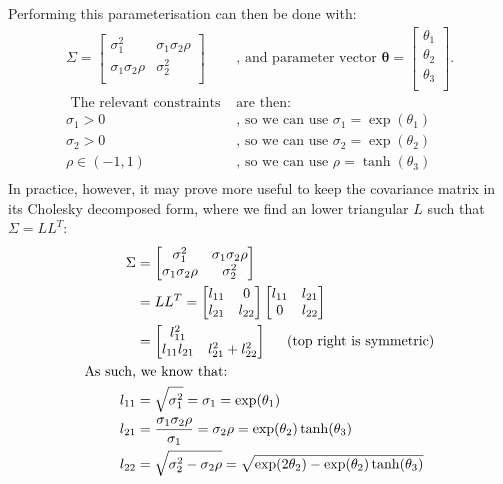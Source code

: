 \documentclass[11pt]{article} %
\begin{document}
Performing this parameterisation can then be done with:
\begin{align*}
\Sigma = \begin{bmatrix}
 \sigma_1^2 & \sigma_1\sigma_2\rho \\
  \sigma_1\sigma_2\rho & \sigma_2^2 \\
\end{bmatrix}& \textrm{, and parameter vector } \boldsymbol{\theta}=\begin{bmatrix}
	\theta_1\\
	\theta_2\\
	\theta_3\\
\end{bmatrix}.\\
\textrm{ The relevant constraints }& \textrm{are then:}\\
	\sigma_1 > 0& \textrm{, so we can use } \sigma_1 = \exp(\theta_1)\\
	\sigma_2 > 0& \textrm{, so we can use } \sigma_2 = \exp(\theta_2)\\
	\rho \in (-1, 1) & \textrm{, so we can use } \rho = \tanh(\theta_3)\\
\end{align*}
In practice, however, it may prove more useful to keep the covariance matrix in its Cholesky decomposed form, where we find an lower triangular $L$ such that $\Sigma=LL^T$:
\begin{align*}
	\Sigma &= \begin{bmatrix}
 \sigma_1^2 & \sigma_1\sigma_2\rho \\
  \sigma_1\sigma_2\rho & \sigma_2^2 \\
\end{bmatrix}\\
&= LL^T = \begin{bmatrix}
 l_{11} & 0 \\
  l_{21} & l_{22} \\
\end{bmatrix}\begin{bmatrix}
 l_{11} & l_{21} \\
  0 & l_{22} \\
\end{bmatrix}\\
&=\begin{bmatrix}
 l_{11}^2 &  \\
  l_{11}l_{21} & l_{21}^2 + l_{22}^2 \\
\end{bmatrix}\hspace{0.5cm}\textrm{(top right is symmetric)}\\
\textrm{As such,}&\textrm{ we know that:}\\
	l_{11} &= \sqrt{\sigma_1^2} =\sigma_1=\exp(\theta_1)\\
	l_{21} &= \frac{\sigma_1\sigma_2\rho}{\sigma_1}=\sigma_2\rho=\exp(\theta_2)\tanh(\theta_3) \\
	l_{22} &= \sqrt{\sigma_2^2 - \sigma_2\rho} = \sqrt{\exp(2\theta_2)-\exp(\theta_2)\tanh(\theta_3)}
\end{align*}
\end{document}

